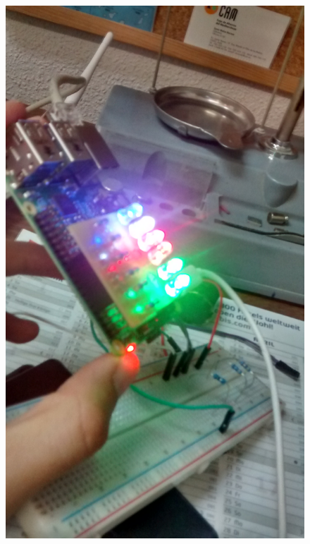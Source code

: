 \documentclass{article}
\begin{document}
\begin{figure}[H]
\centering
\includegraphics[height=0.27\textheight]{led/vista3}

\end{figure}
\end{document}
